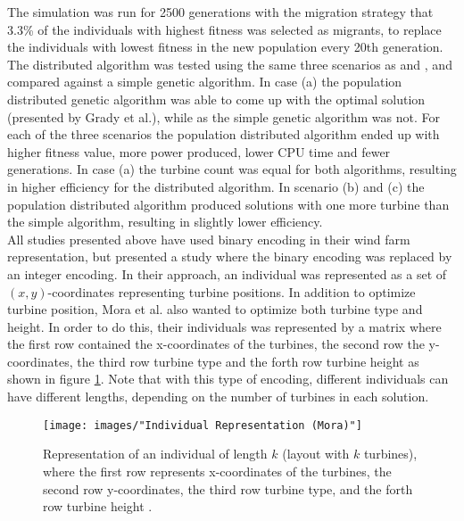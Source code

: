 \noindent The simulation was run for 2500 generations with the migration strategy that 3.3\% of the individuals with highest fitness was selected as migrants, to replace the individuals with lowest fitness in the new population every 20th generation. The distributed algorithm was tested using the same three scenarios as \cite{Mosetti} and \cite{Grady}, and compared against a simple genetic algorithm. In case (a) the population distributed genetic algorithm was able to come up with the optimal solution (presented by Grady et al.), while as the simple genetic algorithm was not. For each of the three scenarios the population distributed algorithm ended up with higher fitness value, more power produced, lower CPU time and fewer generations. In case (a) the turbine count was equal for both algorithms, resulting in higher efficiency for the distributed algorithm. In scenario (b) and (c) the population distributed algorithm produced solutions with one more turbine than the simple algorithm, resulting in slightly lower efficiency. \\


\noindent All studies presented above have used binary encoding in their wind farm representation, but \cite{Mora} presented a study where the binary encoding was replaced by an integer encoding. In their approach, an individual was represented as a set of $(x, y)$-coordinates representing turbine positions. In addition to optimize turbine position, Mora et al. also wanted to optimize both turbine type and height. In order to do this, their individuals was represented by a matrix where the first row contained the x-coordinates of the turbines, the second row the y-coordinates, the third row turbine type and the forth row turbine height as shown in figure \ref{Individual Representation (Mora)}. Note that with this type of encoding, different individuals can have different lengths, depending on the number of turbines in each solution.\\


\begin{figure}[h!]
\begin{center}
\texttt{[image: images/"Individual Representation (Mora)"]}
\caption{Representation of an individual of length $k$ (layout with $k$ turbines), where the first row represents x-coordinates of the turbines, the second row y-coordinates, the third row turbine type, and the forth row turbine height \citep{Mora}.}
\label{Individual Representation (Mora)}
\end{center}
\end{figure}



